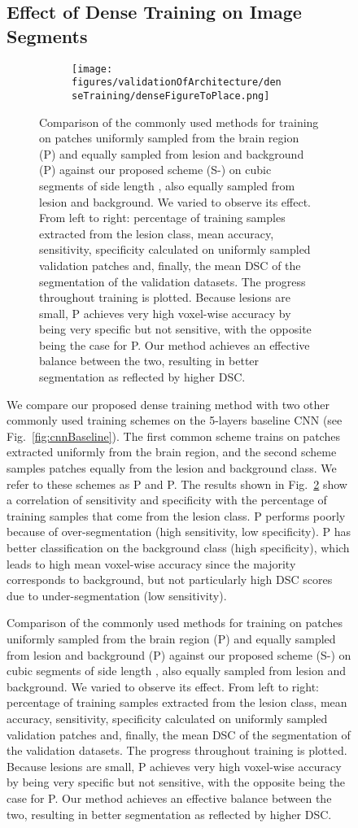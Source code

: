 \documentclass[preprint,authoryear,12pt]{elsarticle}
\begin{document}
\begin{figure}[h]
\subsection{Effect of Dense Training on Image Segments}
\label{subsec:valDenseTraining}

\begin{figure}[!h]
\centering
\begin{subfigure}[b]{1.0\textwidth}
\centering
\texttt{[image: figures/validationOfArchitecture/denseTraining/denseFigureToPlace.png]}
\end{subfigure}
\caption{Comparison of the commonly used methods for training on patches uniformly sampled from the brain region (P) and equally sampled from lesion and background (P) against our proposed scheme (S-) on cubic segments of side length , also equally sampled from lesion and background. We varied  to observe its effect. From left to right: percentage of training samples extracted from the lesion class, mean accuracy, sensitivity, specificity calculated on uniformly sampled validation patches and, finally, the mean DSC of the segmentation of the validation datasets. The progress throughout training is plotted. Because lesions are small, P achieves very high voxel-wise accuracy by being very specific but not sensitive, with the opposite being the case for P. Our method achieves an effective balance between the two, resulting in better segmentation as reflected by higher DSC.}
\label{fig:denseTrainingExperiment}
\end{figure}
%
 
We compare our proposed dense training method with two other commonly used training schemes on the 5-layers baseline CNN (see Fig.~\ref{fig:cnnBaseline}). The first common scheme trains on  patches extracted uniformly from the brain region, and the second scheme samples patches equally from the lesion and background class. We refer to these schemes as P and P. The results shown in Fig.~\ref{fig:denseTrainingExperiment} show a correlation of sensitivity and specificity with the percentage of training samples that come from the lesion class. P performs poorly because of over-segmentation (high sensitivity, low specificity). P has better classification on the background class (high specificity), which leads to high mean voxel-wise accuracy since the majority corresponds to background, but not particularly high DSC scores due to under-segmentation (low sensitivity).


\end{figure}
\end{document}
